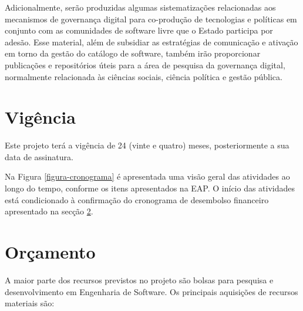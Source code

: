 Adicionalmente, serão produzidas algumas sistematizações relacionadas aos mecanismos de governança digital para co-produção de tecnologias e políticas em conjunto com as comunidades de software livre que o Estado participa por adesão. Esse material, além de subsidiar as estratégias de comunicação e ativação em torno da gestão do catálogo de software, também irão proporcionar publicações e repositórios úteis para a área de pesquisa da governança digital, normalmente relacionada às ciências sociais, ciência política e gestão pública.



\section{Vigência}

Este projeto terá a vigência de 24 (vinte e quatro) meses, posteriormente a sua data de
assinatura.

Na Figura \ref{figura-cronograma} é apresentada uma visão geral das atividades ao
longo do tempo, conforme os itens apresentados na EAP. O 
início das atividades está condicionado à confirmação do cronograma de desembolso
financeiro apresentado na secção \ref{sec:orcamento}.







 
\newpage
\section{Orçamento}
\label{sec:orcamento}


A maior parte dos recursos previstos no projeto são bolsas para pesquisa e 
desenvolvimento em Engenharia de Software. Os principais aquisições de recursos 
materiais são:

